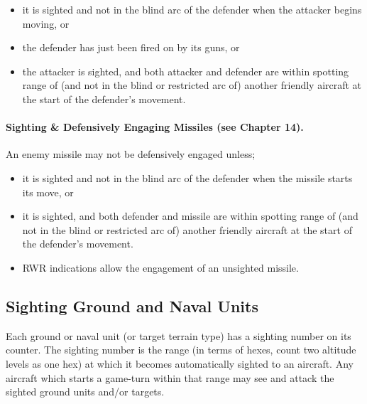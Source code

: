\begin{itemize}
    \item it is sighted and not in the blind arc of the defender when the attacker begins moving, or
    \item the defender has just been fired on by its guns, or
    \item the attacker is sighted, and both attacker and defender are within spotting range of (and not in the blind or restricted arc of) another friendly aircraft at the start of the defender's movement.
\end{itemize}

\paragraph{Sighting \& Defensively Engaging Missiles (see Chapter 14).} An enemy missile may not be defensively engaged unless;

\begin{itemize}
    \item it is sighted and not in the blind arc of the defender when the missile starts its move, or
    \item it is sighted, and both defender and missile are within spotting range of (and not in the blind or restricted arc of) another friendly aircraft at the start of the defender's movement.
    \item RWR indications allow the engagement of an unsighted missile.
\end{itemize}


\subsection{Sighting Ground and Naval Units}

Each ground or naval unit (or target terrain type) has a sighting number on its counter. The sighting number is the range (in terms of hexes, count two altitude levels as one hex) at which it becomes automatically sighted to an aircraft. Any aircraft which starts a game-turn within that range may see and attack the sighted ground units and/or targets.

